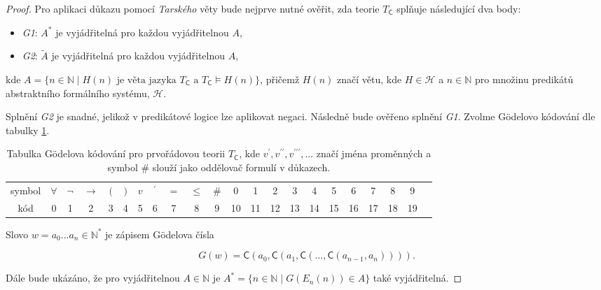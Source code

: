\documentclass[a4paper, 12pt]{article}
\theoremstyle{definition}
\theoremstyle{definition}
\theoremstyle{definition}
\theoremstyle{remark}
\theoremstyle{remark}
\theoremstyle{remark}
\theoremstyle{remark}
\begin{document}
\begin{proof}
    Pro aplikaci důkazu pomocí \textit{Tarského} věty bude nejprve nutné ověřit, zda teorie $T_\mathsf{C}$ splňuje následující dva body:

    \begin{itemize}
        \item \textit{G1}: $A^\ast$ je vyjádřitelná pro každou vyjádřitelnou $A$,
        \item \textit{G2}: $\tilde{A}$ je vyjádřitelná pro každou vyjádřitelnou $A$,
    \end{itemize}

    \noindent
    kde $A = \{n \in \mathbb{N} \; | \; H(n)  \text{ je věta jazyka } T_\mathsf{C} \text{ a } T_\mathsf{C} \models H(n)\}$, přičemž $H(n)$ značí větu, kde $H \in \mathcal{H}$ a $n \in \mathbb{N}$ pro množinu predikátů abstraktního formálního systému, $\mathcal{H}$.

    Splnění \textit{G2} je snadné, jelikož v predikátové logice lze aplikovat negaci. Následně bude ověřeno splnění \textit{G1}. Zvolme Gödelovo kódování dle tabulky \ref{tablecode}.

    \begin{table}[!ht]
    \begin{center}
    \begin{tabular}{ c|c c c c c c c c c c c c c c c c c c c c c }
     symbol &  $\forall$ & $\neg$ & $\rightarrow$ & $($ & $)$ & $v$ & $ ^\prime$ & $=$ & $\leq$ & $\#$ & 0 & 1 & 2 & 3 & 4 & 5 & 6 & 7 & 8 & 9 \\ 
     kód & 0 & 1 & 2 & 3 & 4 & 5 & 6 & 7 & 8 & 9 & 10 & 11 & 12 & 13 & 14 & 15 & 16 & 17 & 18 & 19 \\ 
    \end{tabular}
    \caption{\label{tablecode} Tabulka Gödelova kódování pro prvořádovou teorii $T_\mathsf{C}$, kde $v^\prime, v^{\prime\prime}, v^{\prime\prime\prime}, ...$ značí jména proměnných a symbol $\#$ slouží jako oddělovač formulí v důkazech.}
    \end{center}
    \end{table}

    \newpage

    Slovo $w = a_0 ... a_n \in \mathbb{N}^\ast$ je zápisem Gödelova čísla

    $$G(w) = \mathsf{C}(a_0, \mathsf{C}(a_1, \mathsf{C}(... ,\mathsf{C}(a_{n-1}, a_n)))).$$

    Dále bude ukázáno, že pro vyjádřitelnou $A \in \mathbb{N}$ je $A^\ast = \{n \in \mathbb{N} \; | \; G(E_n(n)) \in A\}$ také vyjádřitelná.


\end{proof}
\end{document}
